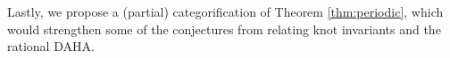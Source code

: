 \documentclass[a4paper,10pt,leqno]{amsart}
\theoremstyle{plain}
\theoremstyle{plain}
\theoremstyle{plain}
\newtheorem{conj}[mainthm]{Conjecture}
\theoremstyle{definition}
\theoremstyle{remark}
\newcommand{\Br}{\mathit{Br}}
\newcommand{\Mod}{\mathsf{Mod}}
\newcommand{\QL}{\bar{\mathbf{Q}}_\ell}
\newcommand{\point}{\mathit{pt}}
\begin{document}

\subsubsection{}

Lastly, we propose a (partial) categorification of Theorem \ref{thm:periodic}, which would strengthen some of the conjectures from \cite{gors} relating knot invariants and the rational DAHA. 
\end{document}
